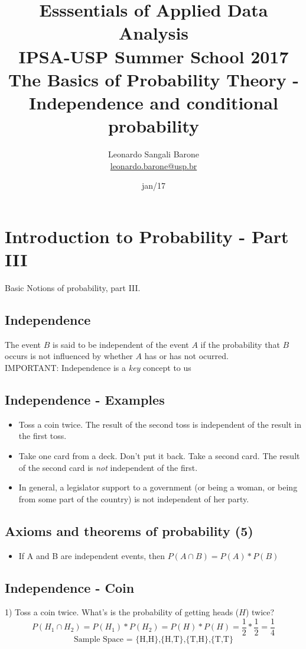 \documentclass[11pt]{article}
\title{\textbf{Esssentials of Applied Data Analysis\\
				IPSA-USP Summer School 2017}\newline\\
				The Basics of Probability Theory - Independence and conditional probability}
\author{Leonardo Sangali Barone\\ \href{leonardo.barone@usp.br}{leonardo.barone@usp.br}}
\date{jan/17}
\begin{document}
\maketitle

\section*{Introduction to Probability - Part III}

	Basic Notions of probability, part III.

	\subsection*{Independence}
	The event $B$ is said to be independent of the event $A$ if the probability that $B$ occurs is not influenced by whether $A$ has or has not ocurred.\\

	IMPORTANT: Independence is a \emph{key} concept to us	

	\subsection*{Independence - Examples}
	\begin{itemize}
		\item Toss a coin twice. The result of the second toss is independent of the result in the first toss. 
		\item Take one card from a deck. Don't put it back. Take a second card. The result of the second card is \emph{not} independent of the first.
		\item In general, a legislator support to a government (or being a woman, or being from some part of the country) is not independent of her party.		
	\end{itemize}	


	\subsection*{Axioms and theorems of probability (5)}
	\begin{itemize}
		\item If A and B are independent events, then $P(A \cap B) = P(A) * P(B)$
	\end{itemize}


	\subsection*{Independence - Coin}
	1) Toss a coin twice.
	What's is the probability of getting heads ($H$) twice?
	\[P(H_1\cap H_2) = P(H_1) * P(H_2) = P(H) * P(H) =\frac{1}{2} * \frac{1}{2} = \frac{1}{4}\]
	\[\text{Sample Space = \{H,H\},\{H,T\},\{T,H\},\{T,T\}}\]
	
\end{document}
